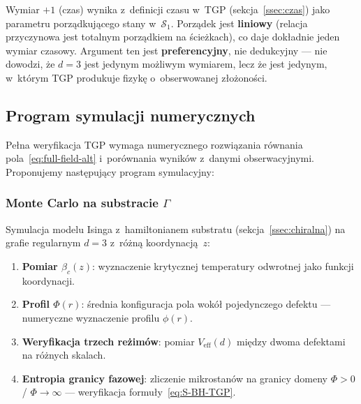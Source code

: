\begin{remark}
Wymiar $+1$ (czas) wynika z~definicji czasu w~TGP
(sekcja~\ref{ssec:czas}) jako parametru porz\k{a}dkuj\k{a}cego
stany w~$\mathcal{S}_1$. Porz\k{a}dek jest \textbf{liniowy}
(relacja przyczynowa jest totalnym porz\k{a}dkiem na \'scie\.zkach),
co daje dok\l{}adnie jeden wymiar czasowy.
Argument ten jest \textbf{preferencyjny}, nie dedukcyjny ---
nie dowodzi, \.ze $d = 3$ jest jedynym mo\.zliwym wymiarem,
lecz \.ze jest jedynym, w~kt\'orym TGP produkuje fizyk\k{e}
o~obserwowanej z\l{}o\.zono\'sci.
\end{remark}



\subsection{Program symulacji numerycznych}\label{ssec:symulacja}

Pe\l{}na weryfikacja TGP wymaga numerycznego rozwi\k{a}zania
r\'ownania pola~\eqref{eq:full-field-alt} i~por\'ownania
wynik\'ow z~danymi obserwacyjnymi. Proponujemy nast\k{e}puj\k{a}cy
program symulacyjny:

\subsubsection{Monte Carlo na substracie $\Gamma$}

Symulacja modelu Isinga z~hamiltonianem substratu
(sekcja~\ref{ssec:chiralna}) na grafie regularnym $d = 3$
z~r\'o\.zn\k{a} koordynacj\k{a}~$z$:
\begin{enumerate}[nosep]
  \item \textbf{Pomiar $\beta_c(z)$}: wyznaczenie krytycznej
        temperatury odwrotnej jako funkcji koordynacji.
  \item \textbf{Profil $\Phi(r)$}: \'srednia konfiguracja pola
        wok\'o\l{} pojedynczego defektu --- numeryczne
        wyznaczenie profilu $\phi(r)$.
  \item \textbf{Weryfikacja trzech re\.zim\'ow}: pomiar
        $V_{\mathrm{eff}}(d)$ mi\k{e}dzy dwoma defektami
        na r\'o\.znych skalach.
  \item \textbf{Entropia granicy fazowej}: zliczenie mikrostanów
        na granicy domeny $\Phi > 0$ / $\Phi \to \infty$
        --- weryfikacja formu\l{}y~\eqref{eq:S-BH-TGP}.
\end{enumerate}

